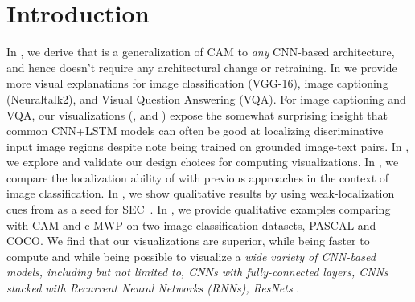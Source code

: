 \section{Introduction}

In , we derive that \gcam{} is a generalization of CAM to \emph{any} CNN-based architecture, and hence doesn't require any architectural change or retraining. 
In  we provide more visual explanations for image classification (VGG-16), image captioning (Neuraltalk2), and Visual Question Answering (VQA). For image captioning and VQA, our visualizations (\gcam{}, and \cgb{}) expose the somewhat surprising insight that common CNN+LSTM
models can often be good at localizing discriminative input image regions despite note being trained on grounded image-text pairs.
In , we explore and validate our design choices for computing \gcam{} visualizations. 
In , we compare the localization ability of \gcam{} with previous approaches in the context of image classification.
In , we show qualitative results by using weak-localization cues from \gcam{} as a seed for SEC~\cite{seed_eccv16}.
In , we provide qualitative examples comparing \gcam{} with CAM and c-MWP on two image classification datasets, PASCAL and COCO. We find that our visualizations are superior, while being faster to compute and while being possible to visualize a  \emph{wide variety of CNN-based models, including but not limited to, CNNs with fully-connected layers, CNNs stacked with Recurrent Neural Networks (RNNs), ResNets \etc}.


